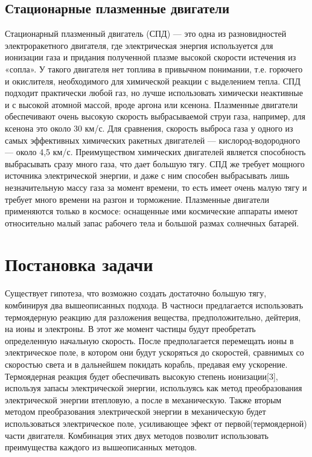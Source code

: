 \documentclass[a4paper,11pt]{article}
\begin{document}
\subsection{Стационарные плазменные двигатели}
Стационарный плазменный двигатель (СПД) — это одна из разновидностей электроракетного двигателя, где электрическая энергия используется для ионизации газа и придания полученной плазме высокой скорости истечения из «сопла». 
У такого двигателя нет топлива в привычном понимании, т.е. горючего и окислителя, 
необходимого для химической реакции с выделением тепла. СПД подходит практически любой газ, но лучше использовать химически неактивные и с высокой атомной массой, вроде аргона или ксенона. Плазменные двигатели обеспечивают очень высокую скорость выбрасываемой струи газа, например, для ксенона это около 30 км/с. Для сравнения, скорость выброса газа у одного из самых эффективных химических ракетных двигателей — кислород-водородного — около 4,5 км/с. Преимуществом химических двигателей является способность выбрасывать сразу много газа, что дает большую тягу. СПД же требует мощного источника электрической энергии, и даже с ним способен выбрасывать лишь незначительную массу газа за момент времени, то есть имеет очень малую тягу и требует много времени на разгон и торможение. Плазменные двигатели применяются только в космосе: оснащенные ими космические аппараты имеют относительно малый запас рабочего тела и большой размах солнечных батарей.



\section{\Large Постановка задачи}
Существует гипотеза, что возможно создать достаточно большую тягу, комбинируя два вышеописанных подхода. 
В частноси предлагается использовать термоядерную реакцию для разложения вещества, предположительно, дейтерия, на ионы и электроны. В этот же момент частицы будут преобретать определенную начальную скорость.  
После предполагается перемещать ионы в электрическое поле, в котором они будут ускоряться до скоростей, сравнимых со скоростью света и в дальнейшем покидать корабль, предавая ему ускорение.
Термоядерная реакция будет обеспечивать высокую степень ионизации[3], используя запасы электрической энергии, используясь как метод преобразования электрической энергии втепловую, а после в механическую. Также вторым методом преобразования электрической энергии в механическую будет использоваться электрическое поле, усиливающее эфект от первой(термоядерной) части двигателя. Комбинация этих двух методов позволит использовать преимущества каждого из вышеописанных методов.
\end{document}
